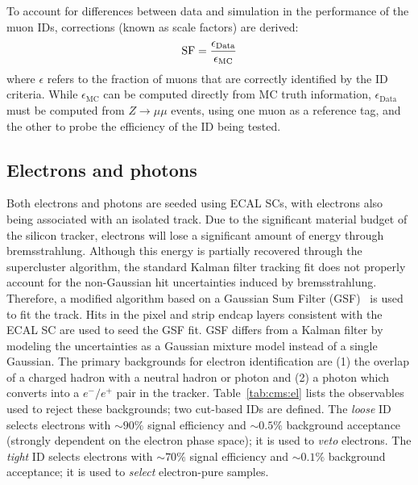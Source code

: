 To account for differences between data and simulation in the performance of the muon IDs, corrections (known as scale factors) are derived:
\begin{equation}
    \mathrm{SF} = \frac{\epsilon_\mathrm{Data}}{\epsilon_\mathrm{MC}}
\end{equation}
where $\epsilon$ refers to the fraction of muons that are correctly identified by the ID criteria.
While $\epsilon_\mathrm{MC}$ can be computed directly from MC truth information, $\epsilon_\mathrm{Data}$ must be computed from $Z\rightarrow \mu\mu$ events, using one muon as a reference tag, and the other to probe the efficiency of the ID being tested.

\subsection{Electrons and photons}

Both electrons and photons are seeded using ECAL SCs, with electrons also being associated with an isolated track.
Due to the significant material budget of the silicon tracker, electrons will lose a significant amount of energy through bremsstrahlung.
Although this energy is partially recovered through the supercluster algorithm, the standard Kalman filter tracking fit does not properly account for the non-Gaussian hit uncertainties induced by bremsstrahlung.
Therefore, a modified algorithm based on a Gaussian Sum Filter (GSF)~\cite{cmstracker,gsf} is used to fit the track.
Hits in the pixel and strip endcap layers consistent with the ECAL SC are used to seed the GSF fit.
GSF differs from a Kalman filter by modeling the uncertainties as a Gaussian mixture model instead of a single Gaussian.
The primary backgrounds for electron identification are (1) the overlap of a charged hadron with a neutral hadron or photon and (2) a photon which converts into a $e^-/e^+$ pair in the tracker.
Table~\ref{tab:cms:el} lists the observables used to reject these backgrounds; two cut-based IDs are defined.
The \emph{loose} ID selects electrons with $\sim90\%$ signal efficiency and $\sim0.5\%$ background acceptance (strongly dependent on the electron phase space); it is used to \emph{veto} electrons. 
The \emph{tight} ID selects electrons with $\sim70\%$ signal efficiency and $\sim0.1\%$ background acceptance; it is used to \emph{select} electron-pure samples. 


